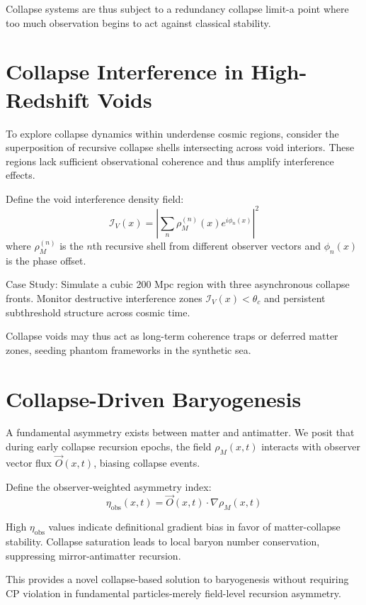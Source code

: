 Collapse systems are thus subject to a redundancy collapse limit-a point where too much observation begins to act against classical stability.

\section{Collapse Interference in High-Redshift Voids}

To explore collapse dynamics within underdense cosmic regions, consider the superposition of recursive collapse shells intersecting across void interiors. These regions lack sufficient observational coherence and thus amplify interference effects\cite{linde2008inflationary}.

Define the void interference density field:
\[
\mathcal{I}_V(x) = \left| \sum_n \rho_M^{(n)}(x) e^{i \phi_n(x)} \right|^2
\]
where \( \rho_M^{(n)} \) is the $n$th recursive shell from different observer vectors and \( \phi_n(x) \) is the phase offset.

Case Study: Simulate a cubic 200 Mpc region with three asynchronous collapse fronts. Monitor destructive interference zones \( \mathcal{I}_V(x) < \theta_c \) and persistent subthreshold structure across cosmic time.

Collapse voids may thus act as long-term coherence traps or deferred matter zones, seeding phantom frameworks in the synthetic sea.

\section{Collapse-Driven Baryogenesis}

A fundamental asymmetry exists between matter and antimatter. We posit that during early collapse recursion epochs, the field \( \rho_M(x,t) \) interacts with observer vector flux \( \vec{O}(x,t) \), biasing collapse events\cite{tegmark2005parallel}.

Define the observer-weighted asymmetry index:
\[
\eta_{\text{obs}}(x,t) = \vec{O}(x,t) \cdot \nabla \rho_M(x,t)
\]

High \( \eta_{\text{obs}} \) values indicate definitional gradient bias in favor of matter-collapse stability. Collapse saturation leads to local baryon number conservation, suppressing mirror-antimatter recursion.

This provides a novel collapse-based solution to baryogenesis without requiring CP violation in fundamental particles-merely field-level recursion asymmetry.

